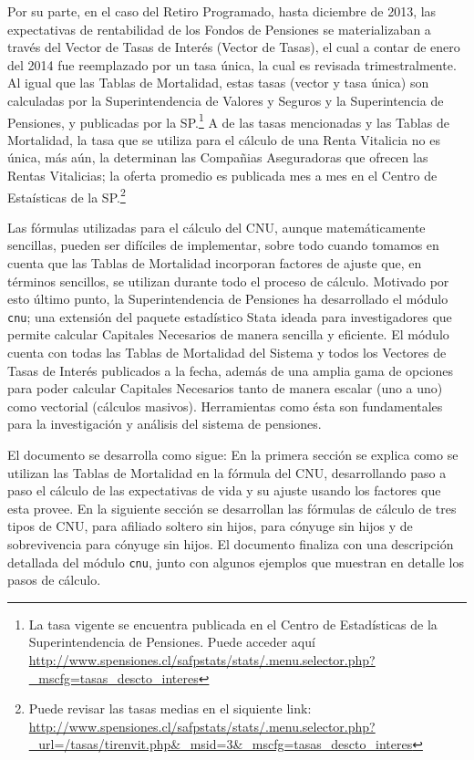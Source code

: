 \documentclass[letterpaper, 11pt]{article}
\begin{document}
Por su parte, en el caso del Retiro Programado, hasta diciembre de 2013, las expectativas
de rentabilidad de los Fondos de Pensiones se materializaban a trav\'es del Vector
de Tasas de Inter\'es (Vector de Tasas), el cual a contar de enero del 2014 
fue reemplazado por un tasa \'unica, la cual es revisada trimestralmente. 
Al igual que las Tablas de Mortalidad,
estas tasas (vector y tasa \'unica) son calculadas por la Superintendencia de Valores y Seguros
y la Superintencia de Pensiones, y publicadas por la
SP.\footnote{La tasa vigente se encuentra publicada en el Centro de 
Estad\'isticas de la Superintendencia de Pensiones. Puede acceder aqu\'i 
\url{http://www.spensiones.cl/safpstats/stats/.menu.selector.php?_mscfg=tasas_descto_interes}}
A de las tasas mencionadas y las Tablas de Mortalidad, la tasa que se utiliza
para el c\'alculo de una Renta Vitalicia no es \'unica, m\'as a\'un, la determinan
las Compa\~nias Aseguradoras que ofrecen las Rentas Vitalicias; la oferta promedio
es publicada mes a mes en el Centro de Esta\'isticas
de la SP.\footnote{
Puede revisar las tasas medias en el siquiente link:
\url{http://www.spensiones.cl/safpstats/stats/.menu.selector.php?_url=/tasas/tirenvit.php&_msid=3&_mscfg=tasas_descto_interes}}

Las f\'ormulas utilizadas para el c\'alculo del CNU, aunque matem\'aticamente
sencillas, pueden ser dif\'iciles de implementar, sobre todo cuando tomamos en
cuenta que las Tablas de Mortalidad incorporan factores de ajuste que, en t\'erminos
sencillos, se utilizan durante todo el proceso de c\'alculo. Motivado por esto
\'ultimo punto, la Superintendencia de Pensiones ha desarrollado el m\'odulo
\texttt{cnu}; una extensi\'on del paquete estad\'istico Stata ideada para
investigadores que permite calcular Capitales Necesarios de manera sencilla y
eficiente. El m\'odulo cuenta con todas las Tablas de Mortalidad del Sistema y
todos los Vectores de Tasas de Inter\'es publicados a la fecha, adem\'as de una
amplia gama de opciones para poder calcular Capitales Necesarios tanto de manera
escalar (uno a uno) como vectorial (c\'alculos masivos). Herramientas como \'esta 
son fundamentales para la investigaci\'on y an\'alisis del sistema de pensiones.


El documento se desarrolla como sigue: En la primera secci\'on se explica como
se utilizan las Tablas de Mortalidad en la f\'ormula del CNU, desarrollando paso
a paso el c\'alculo de las expectativas de vida y su ajuste usando los factores
que esta provee. En la siguiente secci\'on se desarrollan las f\'ormulas de 
c\'alculo de tres tipos de CNU, para afiliado soltero sin hijos, para 
c\'onyuge sin hijos y de sobrevivencia para c\'onyuge sin hijos. El
documento finaliza con una descripci\'on detallada del m\'odulo {\tt cnu}, 
junto con algunos ejemplos que muestran en detalle los pasos de c\'alculo.
\end{document}
